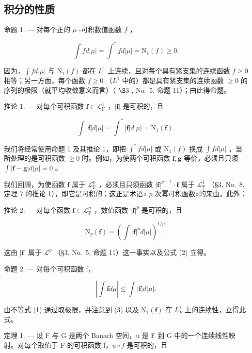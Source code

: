 \subsection{积分的性质}

命题 1. --- 对每个正的 \(\mu\) -可积数值函数 \(f\) ，

\[
\int f d | \mu | = \int^ {*} f d | \mu | = \mathrm{N} _ {1} (f) \geqslant 0.\tag{2}
\]

因为，\(\int f d|\mu|\) 与 \(\mathrm{N}_{1}(f)\) 都在 \(L^{1}\) 上连续，且对每个具有紧支集的连续函数 \(f \geqslant 0\) 相等；另一方面，每个函数 \(f \geqslant 0\) （\(L^{1}\) 中的）都是具有紧支集的连续函数 \(\geqslant 0\) 的序列的极限（就平均收敛意义而言）（ \(\S3\) , No.~5, 命题 11）；由此得命题。

推论 1. --- 对每个可积函数 \(\mathbf{f} \in \mathcal{L}_{\mathrm{F}}^{1}\) ，\(|\mathbf{f}|\) 是可积的，且

\[
\int | \mathbf {f} | d | \mu | = \int^ {*} | \mathbf {f} | d | \mu | = \mathrm{N} _ {1} (\mathbf {f}).\tag{3}
\]

我们将经常使用命题 1 及其推论 1，即把 \(\int^{*}fd|\mu|\) 或 \(\mathrm{N}_{1}(f)\) 换成 \(\int fd|\mu|\) ，当所处理的是可积函数 \(\geqslant 0\) 时。例如，为使两个可积函数 \(\mathbf{f},\mathbf{g}\) 等价，必须且只须 \(\int |\mathbf{f} - \mathbf{g}|d|\mu| = 0\) 。

我们回顾，为使函数 \(\mathbf{f}\) 属于 \(\mathcal{L}_{\mathrm{F}}^{p}\) ，必须且只须函数 \(|\mathbf{f}|^{p - 1}\cdot \mathbf{f}\) 属于 \(\mathcal{L}_{\mathrm{F}}^{1}\) （§3, No.~8, 定理 7 的推论 1），即它是可积的；这正是术语« \(p\) 次幂可积函数»的来由。此外：

推论 2. --- 对每个函数 \(\mathbf{f} \in \mathcal{L}_{\mathrm{F}}^{p}\) ，数值函数 \(|\mathbf{f}|^{p}\) 是可积的，且

\[
\mathrm{N} _ {p} (\mathbf {f}) = \left(\int | \mathbf {f} | ^ {p} d | \mu |\right) ^ {1 / p}.\tag{4}
\]

这由 \(|\mathbf{f}|\) 属于 \(\mathcal{L}^p\) （§3, No.~5, 命题 11）这一事实以及公式 (2) 立得。

命题 2. --- 对每个可积函数 f，

\[
\left| \int \mathbf {f} d \mu \right| \leqslant \int | \mathbf {f} | d | \mu |.\tag{5}
\]

由不等式 (1) 通过取极限，并注意到 (3) 以及 \(\mathrm{N}_{1}(\mathbf{f})\) 在 \(L_{F}^{1}\) 上的连续性，立得此式。

定理 1. --- 设 F 与 G 是两个 Banach 空间，u 是 F 到 G 中的一个连续线性映射。对每个取值于 F 的可积函数 f，\(u \circ f\) 是可积的，且

